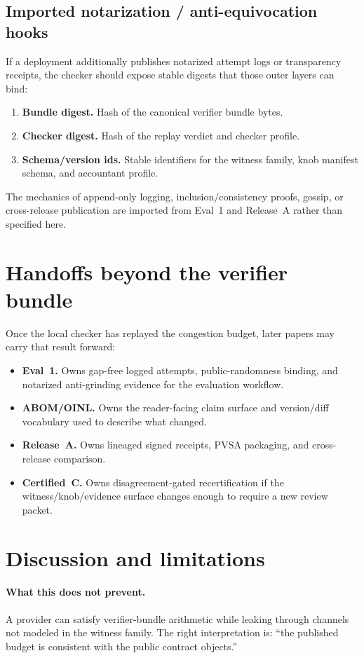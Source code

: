 \documentclass[11pt]{article}
\begin{document}
\subsection{Imported notarization / anti-equivocation hooks}
If a deployment additionally publishes notarized attempt logs or transparency receipts, the checker should expose stable digests that those outer layers can bind:
\begin{enumerate}[leftmargin=1.6em]
\item \textbf{Bundle digest.} Hash of the canonical verifier bundle bytes.
\item \textbf{Checker digest.} Hash of the replay verdict and checker profile.
\item \textbf{Schema/version ids.} Stable identifiers for the witness family, knob manifest schema, and accountant profile.
\end{enumerate}
The mechanics of append-only logging, inclusion/consistency proofs, gossip, or cross-release publication are imported from Eval~1 and Release~A rather than specified here.\cite{series:evalnotary,series:release}

\section{Handoffs beyond the verifier bundle}
Once the local checker has replayed the congestion budget, later papers may carry that result forward:
\begin{itemize}[leftmargin=1.2em]
\item \textbf{Eval~1.} Owns gap-free logged attempts, public-randomness binding, and notarized anti-grinding evidence for the evaluation workflow.\cite{series:evalnotary}
\item \textbf{ABOM/OINL.} Owns the reader-facing claim surface and version/diff vocabulary used to describe what changed.\cite{series:abom}
\item \textbf{Release~A.} Owns lineaged signed receipts, PVSA packaging, and cross-release comparison.\cite{series:release}
\item \textbf{Certified~C.} Owns disagreement-gated recertification if the witness/knob/evidence surface changes enough to require a new review packet.\cite{series:recert}
\end{itemize}
\section{Discussion and limitations}
\paragraph{What this does not prevent.}
A provider can satisfy verifier-bundle arithmetic while leaking through channels not modeled in the witness family.
The right interpretation is: ``the published budget is consistent with the public contract objects.''
\end{document}
